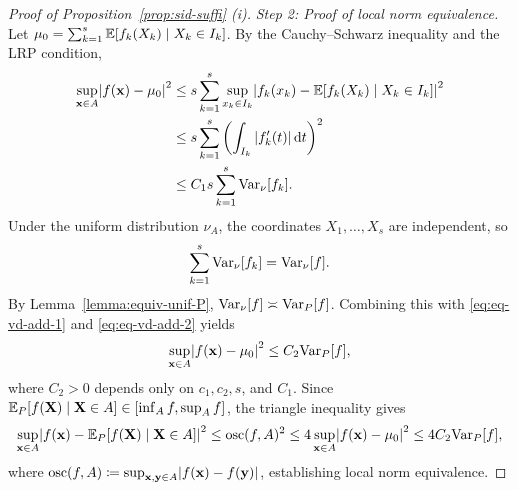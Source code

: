 \documentclass[11pt]{article}
\theoremstyle{plain}
\theoremstyle{definition}
\theoremstyle{remark}
\theoremstyle{plain}
\newcommand{\bx}{\mathbf{x}}
\newcommand{\by}{\mathbf{y}}
\newcommand{\bX}{\mathbf{X}}
\DeclarePairedDelimiter{\bracks}{[}{]}
\DeclarePairedDelimiter{\abs}{|}{|}
\newcommand{\E}{\mathbb{E}}
\newcommand{\Var}{\textnormal{Var}}
\newcommand{\1}{\mathbbm{1}}
\begin{document}
\begin{proof}[Proof of Proposition~\ref{prop:sid-suffi} (i)]
    \textit{Step 2: Proof of local norm equivalence.} Let $\mu_0 = \sum_{k=1}^s \E\bracks*{f_k(X_k) \mid X_k \in I_k}$. By the Cauchy--Schwarz inequality and the LRP condition,
    \begin{equation}\label{eq:eq-vd-add-1}
    \begin{aligned}
        \sup_{\bx \in A} \abs*{f(\bx) - \mu_0}^2
        &\leq s \sum_{k=1}^s \sup_{x_k \in I_k} \abs*{f_k(x_k) - \E\bracks*{f_k(X_k) \mid X_k \in I_k}}^2 \\
        &\leq s \sum_{k=1}^s \left(\int_{I_k}|f_k'(t)|\,\mathrm{d}t\right)^2 \\
        &\leq C_1 s \sum_{k=1}^s \Var_\nu[f_k].
    \end{aligned}
    \end{equation}
    Under the uniform distribution $\nu_A$, the coordinates $X_1, \ldots, X_s$ are independent, so
    \begin{equation}\label{eq:eq-vd-add-2}
        \sum_{k=1}^s \Var_\nu[f_k] = \Var_\nu[f].
    \end{equation}
    By Lemma~\ref{lemma:equiv-unif-P}, $\Var_\nu[f] \asymp \Var_P[f]$. Combining this with \eqref{eq:eq-vd-add-1} and \eqref{eq:eq-vd-add-2} yields
    \begin{equation}\label{eq:eq-vd-add-3}
        \sup_{\bx \in A} \abs*{f(\bx) - \mu_0}^2 \leq C_2 \Var_P[f],
    \end{equation}
    where $C_2 > 0$ depends only on $c_1, c_2, s$, and $C_1$. Since $\E_P\bracks*{f(\bX) \mid \bX \in A} \in [\inf_A f, \sup_A f]$, the triangle inequality gives
    \begin{equation}
        \sup_{\bx \in A} \abs*{f(\bx) - \E_P\bracks*{f(\bX) \mid \bX \in A}}^2 \leq \operatorname{osc}(f, A)^2 \leq 4 \sup_{\bx \in A} \abs*{f(\bx) - \mu_0}^2 \leq 4 C_2 \Var_P[f],
    \end{equation}
    where $\operatorname{osc}(f, A) \coloneqq \sup_{\bx, \by \in A} \abs*{f(\bx) - f(\by)}$, establishing local norm equivalence.
\end{proof}
\end{document}
